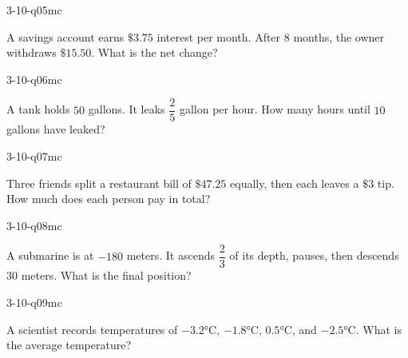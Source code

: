 \begin{practiceQuestion}{3-10-q05}{mc}
\begin{questionText}
A savings account earns $\$3.75$ interest per month. After $8$ months, the owner withdraws $\$15.50$. What is the net change?
\end{questionText}
\end{practiceQuestion}

\begin{practiceQuestion}{3-10-q06}{mc}
\begin{questionText}
A tank holds $50$ gallons. It leaks $\dfrac{2}{5}$ gallon per hour. How many hours until $10$ gallons have leaked?
\end{questionText}
\end{practiceQuestion}

\begin{practiceQuestion}{3-10-q07}{mc}
\begin{questionText}
Three friends split a restaurant bill of $\$47.25$ equally, then each leaves a $\$3$ tip. How much does each person pay in total?
\end{questionText}
\end{practiceQuestion}

\begin{practiceQuestion}{3-10-q08}{mc}
\begin{questionText}
A submarine is at $-180$ meters. It ascends $\dfrac{2}{3}$ of its depth, pauses, then descends $30$ meters. What is the final position?
\end{questionText}
\end{practiceQuestion}

\begin{practiceQuestion}{3-10-q09}{mc}
\begin{questionText}
A scientist records temperatures of $-3.2°$C, $-1.8°$C, $0.5°$C, and $-2.5°$C. What is the average temperature?
\end{questionText}
\end{practiceQuestion}

